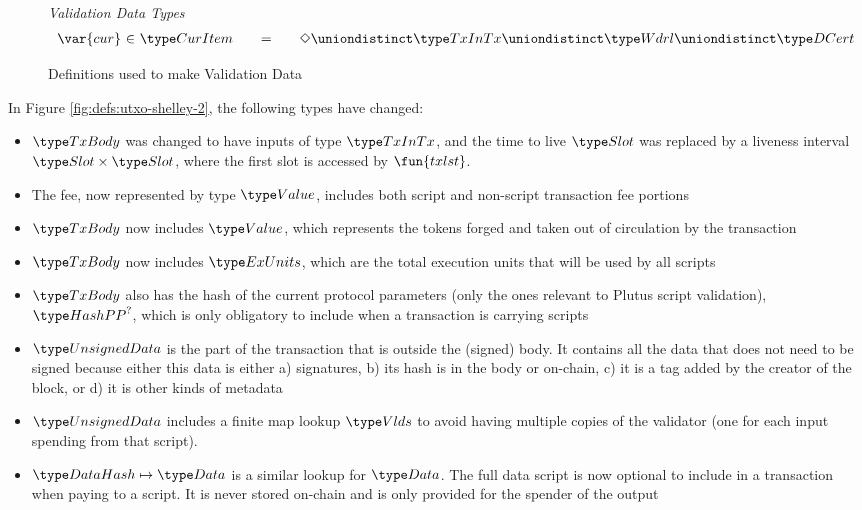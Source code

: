 \begin{figure*}[htb]
  \emph{Validation Data Types}
  \begin{equation*}
    \begin{array}{r@{~\in~}l@{\qquad=\qquad}l}
      \var{cur}
      & \CurItem
      & \Nothing \uniondistinct \TxInTx \uniondistinct \Wdrl \uniondistinct \DCert
    \end{array}
  \end{equation*}
  \caption{Definitions used to make Validation Data}
  \label{fig:defs:utxo-pending}
\end{figure*}


In Figure \ref{fig:defs:utxo-shelley-2}, the following types have changed:

\begin{itemize}
  \item $\TxBody$ was changed to have inputs of type $\TxInTx$, and the
  time to live $\Slot$ was replaced by a liveness interval $\Slot \times \Slot$,
  where the first slot is accessed by $\fun{txlst}$.
  \item The fee, now represented by type $\Value$, includes both script and
  non-script transaction fee portions
  \item $\TxBody$ now includes $\Value$, which represents
  the tokens forged and taken out of circulation by the transaction
  \item $\TxBody$ now includes $\ExUnits$, which are the total execution units
  that will be used by all scripts
  \item $\TxBody$ also has the hash of the current protocol parameters
  (only the ones relevant to Plutus script validation), $\HashPP^?$,
  which is only obligatory to include when a transaction is carrying scripts
  \item $\UnsignedData$ is the part of the transaction that is outside the
  (signed) body.
  It contains all the data that does not need to be signed because either
  this data is either
  a) signatures, b) its hash is in the body or on-chain, c) it is a tag
  added by the creator of the block, or d) it is other kinds of metadata
  \item $\UnsignedData$ includes
  a finite map lookup $\Vlds$ to avoid having multiple
  copies of the validator (one for each input spending from that script).
  \item $\HashDat \mapsto \Data$ is a similar lookup for $\Data$.
  The full data script is now optional to include in a transaction when
  paying to a script. It is never
  stored on-chain and is only provided for the spender of the output

\end{itemize}
